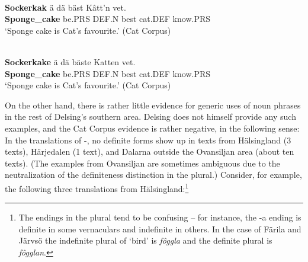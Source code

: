 
\ea\label{}
\\
\gll 	\textbf{Sockerkak} ä  dä  bäst  Kâtt’n  vet.\\
		\textbf{Sponge\_cake} be.PRS  DEF.N  best  cat.DEF  know.PRS\\
\glt ‘Sponge cake is Cat’s favourite.’ (Cat Corpus)

\z

\ea\label{}
\\
\gll 	\textbf{Sockerkake} ä  dä  bäste  Katten  vet.\\
		\textbf{Sponge\_cake} be.PRS  DEF.N  best  cat.DEF  know.PRS\\
\glt 	‘Sponge cake is Cat’s favourite.’ (Cat Corpus)

\z

On the other hand, there is rather little evidence for generic uses of noun phrases in the rest of Delsing’s southern area. Delsing does not himself provide any such examples, and the Cat Corpus evidence is rather negative, in the following sense: In the translations of -, no definite forms show up in texts from Hälsingland (3 texts), Härjedalen (1 text), and Dalarna outside the Ovansiljan area (about ten texts). (The examples from Ovansiljan are sometimes ambiguous due to the neutralization of the definiteness distinction in the plural.) Consider, for example, the following three translations from Hälsingland:\footnote{ The endings in the plural tend to be confusing – for instance, the -a ending is definite in some vernaculars and indefinite in others. In the case of Färila and Järvsö the indefinite plural of ‘bird’ is \textit{fôggla} and the definite plural is \textit{fôgglan}. }

\ea
	
	\z 
\z

